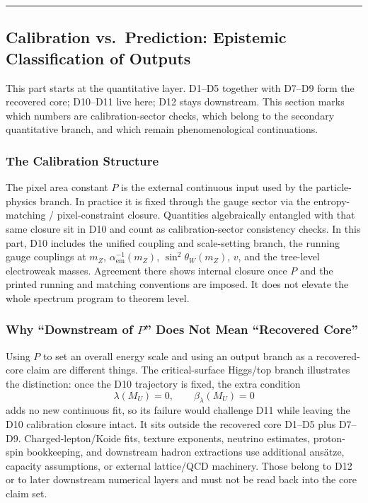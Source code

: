\begin{center}\rule{0.5\linewidth}{0.5pt}\end{center}

\subsection{Calibration vs.\ Prediction: Epistemic Classification of Outputs}\label{1b-calibration-vs-prediction}

This part starts at the quantitative layer. D1--D5 together with D7--D9 form the recovered core; D10--D11 live here; D12 stays downstream. This section marks which numbers are calibration-sector checks, which belong to the secondary quantitative branch, and which remain phenomenological continuations.

\subsubsection{The Calibration Structure}\label{1b1-the-calibration-structure}

The pixel area constant \(P\) is the external continuous input used by the particle-physics branch. In practice it is fixed through the gauge sector via the entropy-matching / pixel-constraint closure. Quantities algebraically entangled with that same closure sit in D10 and count as calibration-sector consistency checks. In this part, D10 includes the unified coupling and scale-setting branch, the running gauge couplings at \(m_Z\), \(\alpha_{\mathrm{em}}^{-1}(m_Z)\), \(\sin^2\theta_W(m_Z)\), \(v\), and the tree-level electroweak masses. Agreement there shows internal closure once \(P\) and the printed running and matching conventions are imposed. It does not elevate the whole spectrum program to theorem level.

\subsubsection{Why ``Downstream of \(P\)'' Does Not Mean ``Recovered Core''}\label{1b2-dimensionless-independence}

Using \(P\) to set an overall energy scale and using an output branch as a recovered-core claim are different things. The critical-surface Higgs/top branch illustrates the distinction: once the D10 trajectory is fixed, the extra condition
\[
\lambda(M_U)=0,\qquad \beta_\lambda(M_U)=0
\]
adds no new continuous fit, so its failure would challenge D11 while leaving the D10 calibration closure intact. It sits outside the recovered core D1--D5 plus D7--D9. Charged-lepton/Koide fits, texture exponents, neutrino estimates, proton-spin bookkeeping, and downstream hadron extractions use additional ans\"atze, capacity assumptions, or external lattice/QCD machinery. Those belong to D12 or to later downstream numerical layers and must not be read back into the core claim set.

